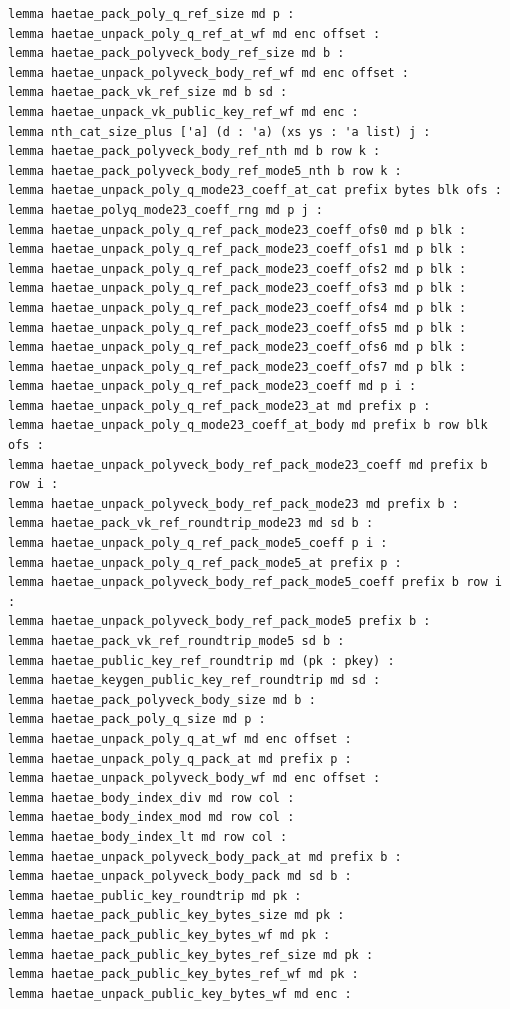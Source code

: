 \begin{lstlisting}[language=EasyCrypt,basicstyle=\ttfamily\tiny]
lemma haetae_pack_poly_q_ref_size md p :
lemma haetae_unpack_poly_q_ref_at_wf md enc offset :
lemma haetae_pack_polyveck_body_ref_size md b :
lemma haetae_unpack_polyveck_body_ref_wf md enc offset :
lemma haetae_pack_vk_ref_size md b sd :
lemma haetae_unpack_vk_public_key_ref_wf md enc :
lemma nth_cat_size_plus ['a] (d : 'a) (xs ys : 'a list) j :
lemma haetae_pack_polyveck_body_ref_nth md b row k :
lemma haetae_pack_polyveck_body_ref_mode5_nth b row k :
lemma haetae_unpack_poly_q_mode23_coeff_at_cat prefix bytes blk ofs :
lemma haetae_polyq_mode23_coeff_rng md p j :
lemma haetae_unpack_poly_q_ref_pack_mode23_coeff_ofs0 md p blk :
lemma haetae_unpack_poly_q_ref_pack_mode23_coeff_ofs1 md p blk :
lemma haetae_unpack_poly_q_ref_pack_mode23_coeff_ofs2 md p blk :
lemma haetae_unpack_poly_q_ref_pack_mode23_coeff_ofs3 md p blk :
lemma haetae_unpack_poly_q_ref_pack_mode23_coeff_ofs4 md p blk :
lemma haetae_unpack_poly_q_ref_pack_mode23_coeff_ofs5 md p blk :
lemma haetae_unpack_poly_q_ref_pack_mode23_coeff_ofs6 md p blk :
lemma haetae_unpack_poly_q_ref_pack_mode23_coeff_ofs7 md p blk :
lemma haetae_unpack_poly_q_ref_pack_mode23_coeff md p i :
lemma haetae_unpack_poly_q_ref_pack_mode23_at md prefix p :
lemma haetae_unpack_poly_q_mode23_coeff_at_body md prefix b row blk ofs :
lemma haetae_unpack_polyveck_body_ref_pack_mode23_coeff md prefix b row i :
lemma haetae_unpack_polyveck_body_ref_pack_mode23 md prefix b :
lemma haetae_pack_vk_ref_roundtrip_mode23 md sd b :
lemma haetae_unpack_poly_q_ref_pack_mode5_coeff p i :
lemma haetae_unpack_poly_q_ref_pack_mode5_at prefix p :
lemma haetae_unpack_polyveck_body_ref_pack_mode5_coeff prefix b row i :
lemma haetae_unpack_polyveck_body_ref_pack_mode5 prefix b :
lemma haetae_pack_vk_ref_roundtrip_mode5 sd b :
lemma haetae_public_key_ref_roundtrip md (pk : pkey) :
lemma haetae_keygen_public_key_ref_roundtrip md sd :
lemma haetae_pack_polyveck_body_size md b :
lemma haetae_pack_poly_q_size md p :
lemma haetae_unpack_poly_q_at_wf md enc offset :
lemma haetae_unpack_poly_q_pack_at md prefix p :
lemma haetae_unpack_polyveck_body_wf md enc offset :
lemma haetae_body_index_div md row col :
lemma haetae_body_index_mod md row col :
lemma haetae_body_index_lt md row col :
lemma haetae_unpack_polyveck_body_pack_at md prefix b :
lemma haetae_unpack_polyveck_body_pack md sd b :
lemma haetae_public_key_roundtrip md pk :
lemma haetae_pack_public_key_bytes_size md pk :
lemma haetae_pack_public_key_bytes_wf md pk :
lemma haetae_pack_public_key_bytes_ref_size md pk :
lemma haetae_pack_public_key_bytes_ref_wf md pk :
lemma haetae_unpack_public_key_bytes_wf md enc :

\end{lstlisting}
